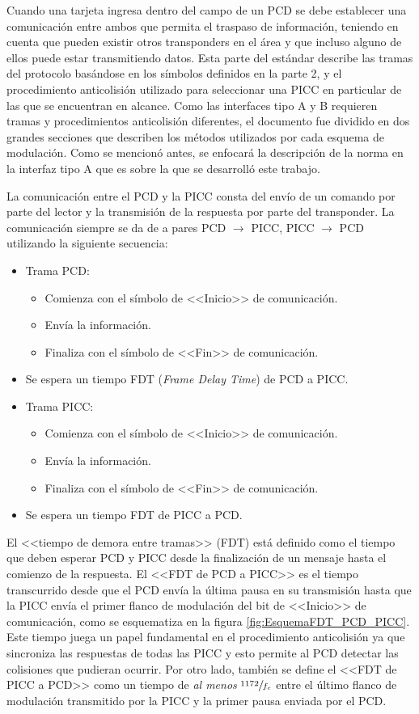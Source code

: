 Cuando una tarjeta ingresa dentro del campo de un PCD se debe establecer una 
comunicación entre ambos que permita el traspaso de información, teniendo en 
cuenta que pueden existir otros transponders en el área y que incluso alguno 
de ellos puede estar transmitiendo datos. Esta parte del estándar describe 
las tramas del protocolo basándose en los símbolos definidos en la parte 2, 
y el procedimiento anticolisión utilizado para seleccionar una PICC en 
particular de las que se encuentran en alcance. Como las interfaces tipo A y 
B requieren tramas y procedimientos anticolisión diferentes, el documento 
fue dividido en dos grandes secciones que describen los métodos utilizados 
por cada esquema de modulación. Como se mencionó antes, se enfocará la 
descripción de la norma en la interfaz tipo A que es sobre la que se 
desarrolló este trabajo.

La comunicación entre el PCD y la PICC consta del envío de un comando por 
parte del lector y la transmisión de la respuesta por parte del transponder. 
La comunicación siempre se da de a pares PCD \(\rightarrow\) PICC, PICC \(
\rightarrow\) PCD utilizando la siguiente secuencia:

\begin{itemize}
	\item Trama PCD:
	\begin{itemize}
		\item Comienza con el símbolo de <<Inicio>> de comunicación.
		\item Envía la información.
		\item Finaliza con el símbolo de <<Fin>> de comunicación.
	\end{itemize}
	\item Se espera un tiempo FDT (\emph{Frame Delay Time}) de PCD a PICC.
	\item Trama PICC:
	\begin{itemize}
		\item Comienza con el símbolo de <<Inicio>> de comunicación.
		\item Envía la información.
		\item Finaliza con el símbolo de <<Fin>> de comunicación.
	\end{itemize}
	\item Se espera un tiempo FDT de PICC a PCD.
\end{itemize}

El <<tiempo de demora entre tramas>> (FDT) está definido como el tiempo que 
deben esperar PCD y PICC desde la finalización de un mensaje hasta el 
comienzo de la respuesta. El <<FDT de PCD a PICC>> es el tiempo transcurrido 
desde que el PCD envía la última pausa en su transmisión hasta que la PICC 
envía el primer flanco de modulación del bit de <<Inicio>> de comunicación, 
como se esquematiza en la figura \ref{fig:EsquemaFDT_PCD_PICC}. Este tiempo 
juega un papel fundamental en el procedimiento anticolisión ya que 
sincroniza las respuestas de todas las PICC y esto permite al PCD detectar 
las colisiones que pudieran ocurrir. Por otro lado, también se define el 
<<FDT de PICC a PCD>> como un tiempo de \emph{al menos} \(\sfrac{1172}{f_c}\)
entre el último flanco de modulación transmitido por la PICC y la primer 
pausa enviada por el PCD.

